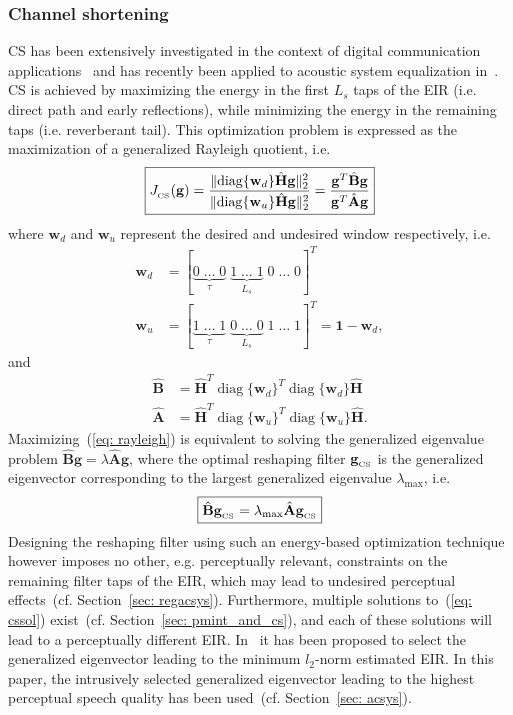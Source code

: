 \documentclass[10pt]{IEEEtran}
\DeclareMathOperator{\diag}{diag}
\begin{document}
\subsubsection*{Channel shortening~\cite{Kallinger_ICASSP_2006}}
CS has been extensively investigated in the context of digital communication applications~\cite{Martin_ITSP_2005} and has recently been applied to acoustic system equalization in~\cite{Kallinger_ICASSP_2006, Zhang_IWAENC_2010}.
CS is achieved by maximizing the energy in the first $L_s$ taps of the EIR (i.e. direct path and early reflections), while minimizing the energy in the remaining taps (i.e. reverberant tail).
This optimization problem is expressed as the maximization of a generalized Rayleigh quotient, i.e.
\begin{equation}
\label{eq: rayleigh}
\boxed{J_{_{\rm CS}} (\mathbf{g}) =  \frac{\|{\diag}\{\mathbf{w}_d\}\hat{\mathbf{H}}\mathbf{g}\|_2^2}{\|{\diag}\{\mathbf{w}_u\}\hat{\mathbf{H}}\mathbf{g}\|_2^2} = \frac{\mathbf{g}^T \hat{\mathbf{B}} \mathbf{g}}{\mathbf{g}^T \hat{\mathbf{A}} \mathbf{g}}}
\end{equation}
where $\mathbf{w}_d$ and $\mathbf{w}_u$ represent the desired and undesired window respectively, i.e.
\begin{align}
\label{eq: wincs}
\mathbf{w}_d & = [\underbrace{0 \; \ldots \; 0}_{\tau} \; \underbrace{1 \; \ldots \; 1}_{L_s}\; 0\; \ldots\; 0]^{T}  \\
\mathbf{w}_u & = [\underbrace{1 \; \ldots \; 1}_{\tau} \; \underbrace{0 \; \ldots \; 0}_{L_s}\; 1\; \ldots\; 1]^{T} = \mathbf{1} - \mathbf{w}_d,
\end{align}
and
\begin{align}
\hat{\mathbf{B}} & = \hat{\mathbf{H}}^{T} {\diag}\{\mathbf{w}_d \}^T{\diag}\{\mathbf{w}_d \}\hat{\mathbf{H}}  \\
\hat{\mathbf{A}} & = \hat{\mathbf{H}}^{T} {\diag}\{\mathbf{w}_u \}^T{\diag}\{\mathbf{w}_u \}\hat{\mathbf{H}}.
\end{align}
Maximizing~(\ref{eq: rayleigh}) is equivalent to solving the generalized eigenvalue problem $\hat{\mathbf{B}} \mathbf{g} = \lambda \hat{\mathbf{A}} \mathbf{g}$, where the optimal reshaping filter $\mathbf{g}_{_{\rm CS}}$ is the generalized eigenvector corresponding to the largest generalized eigenvalue $\lambda_{\max}$, i.e.
\begin{equation}
\label{eq: cssol}
\boxed{\hat{\mathbf{B}} \mathbf{g}_{_{\rm CS}} = \lambda_{\max} \hat{\mathbf{A}}\mathbf{g}_{_{\rm CS}}}
\end{equation}
Designing the reshaping filter using such an energy-based optimization technique however imposes no other, e.g. perceptually relevant, constraints on the remaining filter taps of the EIR, which may lead to undesired perceptual effects~(cf. Section~\ref{sec: regacsys}).
Furthermore, multiple solutions to~(\ref{eq: cssol}) exist~(cf. Section~\ref{sec: pmint_and_cs}), and each of these solutions will lead to a perceptually different EIR.
In~\cite{Zhang_IWAENC_2010} it has been proposed to select the generalized eigenvector leading to the minimum $l_2$-norm estimated EIR.
In this paper, the intrusively selected generalized eigenvector leading to the highest perceptual speech quality has been used~(cf. Section~\ref{sec: acsys}).
\end{document}
